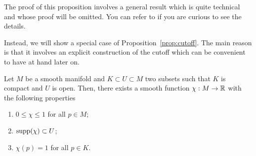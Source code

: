 The proof of this proposition involves a general result which is quite technical and whose proof will be omitted.
You can refer to \cite{book:lee, book:tu} if you are curious to see the details.

Instead, we will show a special case of Proposition~\ref{prop:cutoff}. The main reason is that it involves an explicit construction of the cutoff which can be convenient to have at hand later on.

\begin{lemma}
  Let $M$ be a smooth manifold and $K\subset U\subset M$ two subsets such that $K$ is compact and $U$ is open.
  Then, there exists a smooth function $\chi: M \to\mathbb{R}$ with the following properties
  \begin{enumerate}
    \item $0 \leq \chi \leq 1$ for all $p\in M$;
    \item $\operatorname{supp}(\chi)\subset U$;
    \item $\chi(p) = 1$ for all $p\in K$.
  \end{enumerate}
\end{lemma}
